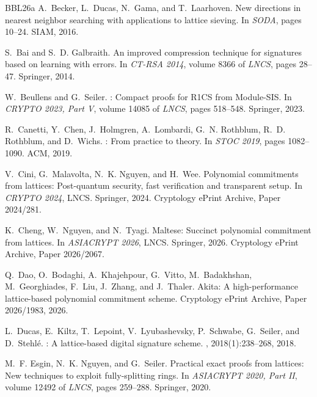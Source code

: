 \begin{thebibliography}{BBL{\etalchar{+}}26a}
A.~Becker, L.~Ducas, N.~Gama, and T.~Laarhoven.
\newblock New directions in nearest neighbor searching with applications to lattice sieving.
\newblock In {\em SODA}, pages 10--24. SIAM, 2016.

S.~Bai and S.~D. Galbraith.
\newblock An improved compression technique for signatures based on learning with errors.
\newblock In {\em CT-RSA 2014}, volume 8366 of {\em LNCS}, pages 28--47. Springer, 2014.

W.~Beullens and G.~Seiler.
: Compact proofs for {R1CS} from {Module-SIS}.
\newblock In {\em CRYPTO 2023, Part V}, volume 14085 of {\em LNCS}, pages 518--548. Springer, 2023.

R.~Canetti, Y.~Chen, J.~Holmgren, A.~Lombardi, G.~N. Rothblum, R.~D. Rothblum, and D.~Wichs.
: From practice to theory.
\newblock In {\em STOC 2019}, pages 1082--1090. ACM, 2019.

V.~Cini, G.~Malavolta, N.~K. Nguyen, and H.~Wee.
\newblock Polynomial commitments from lattices: Post-quantum security, fast verification and transparent setup.
\newblock In {\em CRYPTO 2024}, LNCS. Springer, 2024.
\newblock Cryptology ePrint Archive, Paper 2024/281.

K.~Cheng, W.~Nguyen, and N.~Tyagi.
\newblock Maltese: Succinct polynomial commitment from lattices.
\newblock In {\em ASIACRYPT 2026}, LNCS. Springer, 2026.
\newblock Cryptology ePrint Archive, Paper 2026/2067.

Q.~Dao, O.~Bodaghi, A.~Khajehpour, G.~Vitto, M.~Badakhshan, M.~Georghiades, F.~Liu, J.~Zhang, and J.~Thaler.
\newblock Akita: A high-performance lattice-based polynomial commitment scheme.
\newblock Cryptology ePrint Archive, Paper 2026/1983, 2026.

L.~Ducas, E.~Kiltz, T.~Lepoint, V.~Lyubashevsky, P.~Schwabe, G.~Seiler, and D.~Stehl{\'e}.
: A lattice-based digital signature scheme.
, 2018(1):238--268, 2018.

M.~F. Esgin, N.~K. Nguyen, and G.~Seiler.
\newblock Practical exact proofs from lattices: New techniques to exploit fully-splitting rings.
\newblock In {\em ASIACRYPT 2020, Part II}, volume 12492 of {\em LNCS}, pages 259--288. Springer, 2020.


\end{thebibliography}

